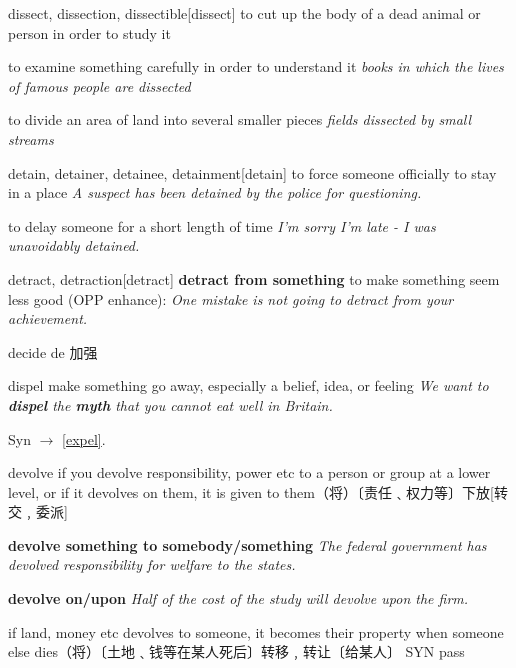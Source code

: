 \begin{word}{dissect, dissection, dissectible}[dissect]
    to cut up the body of a dead animal or person in order to study it

    to examine something carefully in order to understand it
    \textit{books in which the lives of famous people are dissected}

    to divide an area of land into several smaller pieces
    \textit{fields dissected by small streams}
\end{word}

\begin{word}{detain, detainer, detainee, detainment}[detain]
    to force someone officially to stay in a place
    \textit{A suspect has been detained by the police for questioning.}

    to delay someone for a short length of time
\textit{I'm sorry I'm late - I was unavoidably detained.}
\end{word}

\begin{word}{detract, detraction}[detract]
    \textbf{detract from something}
    to make something seem less good (OPP  enhance):
    \textit{One mistake is not going to detract from your achievement.}
\end{word}

\begin{word}{decide}
    de 加强
\end{word}

\begin{word}{dispel}
    make something go away, especially a belief, idea, or feeling
    \textit{We want to \textbf{dispel} the \textbf{myth} that you cannot eat well in Britain.}

    Syn $\rightarrow$ \ref{expel}.
\end{word}

\begin{word}{devolve}
    if you devolve responsibility, power etc to a person or group at a lower level, or if it devolves on them, it is given to them（将）〔责任﹑权力等〕下放[转交﹐委派]

    \textbf{devolve something to somebody/something}
    \textit{The federal government has devolved responsibility for welfare to the states.}

    \textbf{devolve on/upon}
    \textit{Half of the cost of the study will devolve upon the firm.}

    if land, money etc devolves to someone, it becomes their property when someone else dies（将）〔土地﹑钱等在某人死后〕转移﹐转让〔给某人〕 SYN  pass
\end{word}

